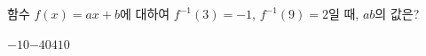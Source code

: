 \hspace*{2mm}\begin{minipage}[t]{\dimexpr\linewidth-2mm\relax}\vspace{0pt}
함수 $f(x)=ax+b$에 대하여 $f^{-1}(3)=-1$, $f^{-1}(9)=2$일 때, $ab$의 값은? 
\begin{choices32}{$-10$}{$-4$}{$0$}{$4$}{$10$}\end{choices32}\end{minipage}
